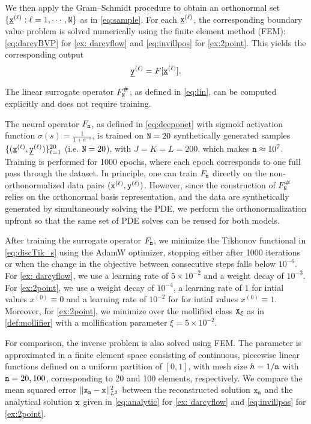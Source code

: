 \documentclass[10pt]{article}
\numberwithin{equation}{section}
\theoremstyle{nonumberplain}
\newcommand{\norms}[1]{\|#1\|}
\newcommand{\X}{{\tt X}}
\newcommand{\y}{{\tt y}}
\newcommand{\n}{{\tt n}}
\newcommand{\x}{{\tt x}}
\newcommand{\ulx}{\underline{\x}}
\newcommand{\uly}{\underline{\y}}
\newcommand{\no}{{\tt N}}
\begin{document}
We then apply the Gram–Schmidt procedure to obtain an orthonormal set $\{\ulx^{(\ell)} : \ell = 1,\cdots, \no\}$ as in \autoref{eq:sample}. For each $\ulx^{(\ell)}$, the corresponding boundary value problem is solved numerically using the finite element method (FEM): \autoref{eq:darcyBVP} for \autoref{ex: darcyflow} and \autoref{eq:invillpos} for \autoref{ex:2point}. This yields the corresponding output $$\uly^{(\ell)} = F[\ulx^{(\ell)}].$$

The linear surrogate operator $F_\no^\#$, as defined in \autoref{eq:lin}, can be computed explicitly and does not require training.

The neural operator $F_\n$, as defined in \autoref{eq:deeponet} with sigmoid activation function $\sigma(s) = \frac{1}{1+e^{-s}}$, is trained on $\no=20$ synthetically generated samples $\{(\ulx^{(\ell)},\uly^{(\ell)})\}_{\ell=1}^{20}$ (i.e. ${\tt N} = 20$), with $J = K = L = 200$, which makes $\n \approx 10^7$. Training is performed for 1000 epochs, where each epoch corresponds to one full pass through the dataset. In principle, one can train $F_\n$ directly on the non-orthonormalized data pairs $(\x^{(\ell)},\y^{(\ell)})$. However, since the construction of $F_\no^\#$ relies on the orthonormal basis representation, and the data are synthetically generated by simultaneously solving the PDE, we perform the orthonormalization upfront so that the same set of PDE solves can be reused for both models.

After training the surrogate operator $F_\n$, we minimize the Tikhonov functional in \autoref{eq:discTik_s} using the AdamW optimizer, stopping either after 1000 iterations or when the change in the objective between consecutive steps falls below $10^{-6}$. For \autoref{ex: darcyflow}, we use a learning rate of $5 \times 10^{-2}$ and a weight decay of $10^{-3}$. For \autoref{ex:2point}, we use a weight decay of $10^{-4}$, a learning rate of $1$ for intial values $x^{(0)} \equiv 0$ and a learning rate of $10^{-2}$ for for intial values $x^{(0)} \equiv 1$. Moreover, for \autoref{ex:2point}, we minimize over the mollified class $\X_\xi$ as in \autoref{def:mollifier} with a mollification parameter $\xi = 5 \times 10^{-2}$.

For comparison, the inverse problem is also solved using FEM. The parameter is approximated in a finite element space consisting of continuous, piecewise linear functions defined on a uniform partition of $[0,1]$, with mesh size $h=1/\n$ with $\n=20,100$, corresponding to 20 and 100 elements, respectively. We compare the mean squared error $\norms{\x_\n - \x}_{L^2}^2$ between the reconstructed solution $\x_\n$ and the analytical solution $\x$ given in \autoref{eq:analytic} for \autoref{ex: darcyflow} and \autoref{eq:invillpos} for \autoref{ex:2point}.
\end{document}
